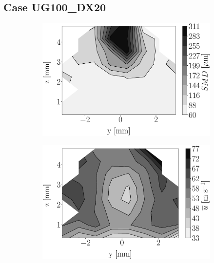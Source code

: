 \clearpage

\subsection{Case UG100\_DX20}





\begin{figure}[h!]
\flushleft
\begin{subfigure}[b]{0.22\textwidth}
	\centering
   \includegraphics[scale=0.17]{./part2_developments/figures_ch5_resolved_JICF/injectors_SLI/uG100_dx20_x05_SMD_map.eps}
\end{subfigure}
   \hspace{0.17in}
\begin{subfigure}[b]{0.22\textwidth}
	\centering
   \includegraphics[scale=0.17]{./part2_developments/figures_ch5_resolved_JICF/injectors_SLI/uG100_dx20_x05_ux_mean_map.eps}

\end{subfigure}
\end{figure}
